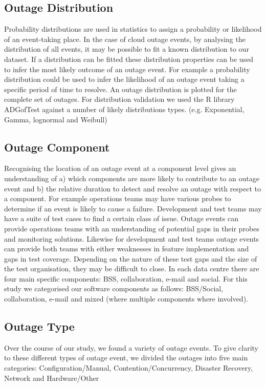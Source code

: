 \documentclass[conference]{IEEEtran}
\begin{document}
\subsection{Outage Distribution}

Probability distributions are used in statistics to assign a probability or likelihood of an event-taking place. In the case of cloud outage events, by analysing the distribution of all events, it may be possible to fit a known distribution to our dataset. If a distribution can be fitted these distribution properties can be used to infer the most likely outcome of an outage event. For example a probability distribution could be used to infer the likelihood of an outage event taking a specific period of time to resolve. An outage distribution is plotted for the complete set of outages. For distribution validation we used the R library ADGofTest \cite{ADGoF} against a number of likely distributions types. (e.g. Exponential, Gamma, lognormal and Weibull)

\subsection{Outage Component}

Recognising the location of an outage event at a component level gives an understanding of a) which components are more likely to contribute to an outage event and b) the relative duration to detect and resolve an outage with respect to a component. For example operations teams may have various probes to determine if an event is likely to cause a failure. Development and test teams may have a suite of test cases to find a certain class of issue. Outage events can provide operations teams with an understanding of potential gaps in their probes and monitoring solutions. Likewise for development and test teams outage events can provide both teams with either weaknesses in feature implementation and gaps in test coverage. Depending on the nature of these test gaps and the size of the test organisation, they may be difficult to close. In each data centre there are four main specific components: BSS, collaboration, e-mail and social. For this study we categorised our software components as follows: BSS/Social, collaboration, e-mail and mixed (where multiple components where involved). \par

\subsection{Outage Type}
Over the course of our study, we found a variety of outage events. To give clarity to these different types of outage event, we divided the outages into five main categories: Configuration/Manual, Contention/Concurrency, Disaster Recovery, Network and Hardware/Other \par
\end{document}

